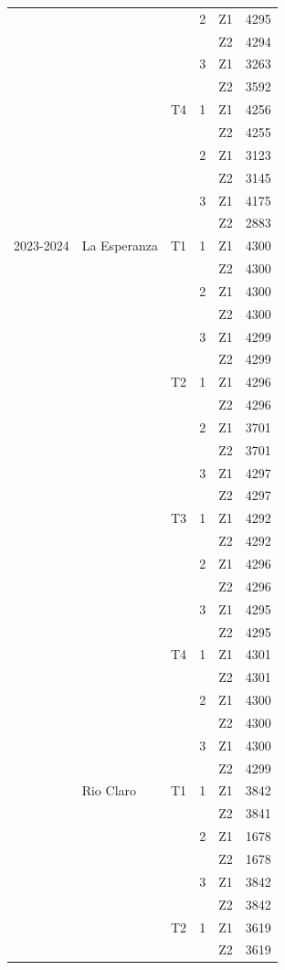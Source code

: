 \documentclass[
  letterpaper,
  DIV=11,
  numbers=noendperiod]{scrreprt}
\begin{document}
\begin{longtable}[]{@{}lllllr@{}}
& & & 2 & Z1 & 4295 \\
& & & & Z2 & 4294 \\
& & & 3 & Z1 & 3263 \\
& & & & Z2 & 3592 \\
& & T4 & 1 & Z1 & 4256 \\
& & & & Z2 & 4255 \\
& & & 2 & Z1 & 3123 \\
& & & & Z2 & 3145 \\
& & & 3 & Z1 & 4175 \\
& & & & Z2 & 2883 \\
2023-2024 & La Esperanza & T1 & 1 & Z1 & 4300 \\
& & & & Z2 & 4300 \\
& & & 2 & Z1 & 4300 \\
& & & & Z2 & 4300 \\
& & & 3 & Z1 & 4299 \\
& & & & Z2 & 4299 \\
& & T2 & 1 & Z1 & 4296 \\
& & & & Z2 & 4296 \\
& & & 2 & Z1 & 3701 \\
& & & & Z2 & 3701 \\
& & & 3 & Z1 & 4297 \\
& & & & Z2 & 4297 \\
& & T3 & 1 & Z1 & 4292 \\
& & & & Z2 & 4292 \\
& & & 2 & Z1 & 4296 \\
& & & & Z2 & 4296 \\
& & & 3 & Z1 & 4295 \\
& & & & Z2 & 4295 \\
& & T4 & 1 & Z1 & 4301 \\
& & & & Z2 & 4301 \\
& & & 2 & Z1 & 4300 \\
& & & & Z2 & 4300 \\
& & & 3 & Z1 & 4300 \\
& & & & Z2 & 4299 \\
& Rio Claro & T1 & 1 & Z1 & 3842 \\
& & & & Z2 & 3841 \\
& & & 2 & Z1 & 1678 \\
& & & & Z2 & 1678 \\
& & & 3 & Z1 & 3842 \\
& & & & Z2 & 3842 \\
& & T2 & 1 & Z1 & 3619 \\
& & & & Z2 & 3619 \\

\end{longtable}
\end{document}
